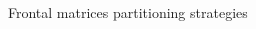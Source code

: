 \begin{frame}{Frontal matrices partitioning strategies}
\begin{columns}
\begin{column}{0.3\textwidth}
\begin{center}
      \end{center}
    \end{column}
  \end{columns}
\end{frame}

